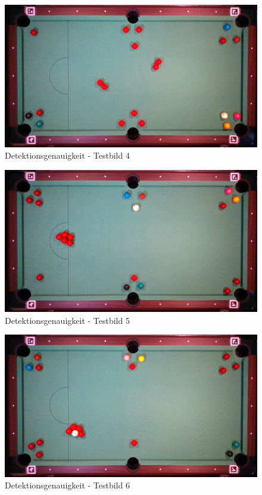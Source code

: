 \begin{figure}[h!]
    \begin{center}
        \includegraphics[width=0.8\linewidth]{../common/07_appendix/resources/00_detection/03_detektion_testbild_4.png}
    \end{center}
    \caption{Detektionsgenauigkeit - Testbild 4}
    \label{fig:detektionsgenauigkeit:testbild:4}
\end{figure}
\begin{figure}[h!]
    \begin{center}
        \includegraphics[width=0.8\linewidth]{../common/07_appendix/resources/00_detection/04_detektion_testbild_5.png}
    \end{center}
    \caption{Detektionsgenauigkeit - Testbild 5}
    \label{fig:detektionsgenauigkeit:testbild:5}
\end{figure}
\begin{figure}[h!]
    \begin{center}
        \includegraphics[width=0.8\linewidth]{../common/07_appendix/resources/00_detection/05_detektion_testbild_6.png}
    \end{center}
    \caption{Detektionsgenauigkeit - Testbild 6}
    \label{fig:detektionsgenauigkeit:testbild:6}
\end{figure}
